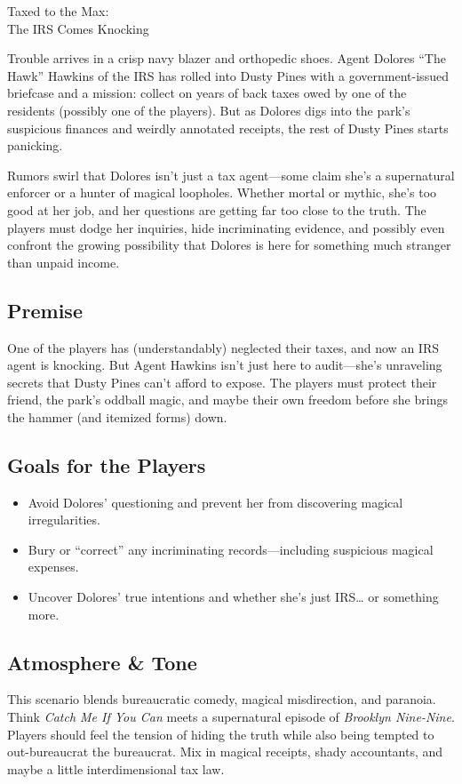\begin{WyrdScenarioHeading}{Taxed to the Max:\\ The IRS Comes Knocking}
    \label{scenario:taxed-to-the-max}

    Trouble arrives in a crisp navy blazer and orthopedic shoes. Agent Dolores “The Hawk” Hawkins of the IRS has rolled into Dusty Pines with a government-issued briefcase and a mission: collect on years of back taxes owed by one of the residents (possibly one of the players). But as Dolores digs into the park’s suspicious finances and weirdly annotated receipts, the rest of Dusty Pines starts panicking.

    Rumors swirl that Dolores isn’t just a tax agent—some claim she’s a supernatural enforcer or a hunter of magical loopholes. Whether mortal or mythic, she’s too good at her job, and her questions are getting far too close to the truth. The players must dodge her inquiries, hide incriminating evidence, and possibly even confront the growing possibility that Dolores is here for something much stranger than unpaid income.

    \subsection*{Premise}
    One of the players has (understandably) neglected their taxes, and now an IRS agent is knocking. But Agent Hawkins isn’t just here to audit—she’s unraveling secrets that Dusty Pines can't afford to expose. The players must protect their friend, the park’s oddball magic, and maybe their own freedom before she brings the hammer (and itemized forms) down.

    \subsection*{Goals for the Players}
    \begin{itemize}
        \item Avoid Dolores’ questioning and prevent her from discovering magical irregularities.
        \item Bury or “correct” any incriminating records—including suspicious magical expenses.
        \item Uncover Dolores’ true intentions and whether she’s just IRS… or something more.
    \end{itemize}

    \subsection*{Atmosphere \& Tone}
    This scenario blends bureaucratic comedy, magical misdirection, and paranoia. Think \textit{Catch Me If You Can} meets a supernatural episode of \textit{Brooklyn Nine-Nine}. Players should feel the tension of hiding the truth while also being tempted to out-bureaucrat the bureaucrat. Mix in magical receipts, shady accountants, and maybe a little interdimensional tax law.
\end{WyrdScenarioHeading}

